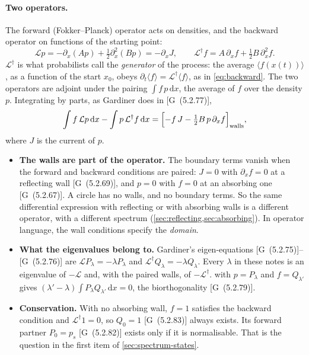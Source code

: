 \documentclass[11pt]{article}
\numberwithin{equation}{section}
\newcommand{\dd}{\mathrm{d}}
\newcommand{\avg}[1]{\langle #1\rangle}
\newcommand{\G}[1]{[G~(#1)]}
\begin{document}
\paragraph{Two operators.} The forward (Fokker--Planck) operator acts on densities, and the backward operator on
functions of the starting point:
\begin{equation}
  \mathcal Lp=-\partial_x(Ap)+\tfrac12\partial_x^2(Bp)=-\partial_xJ,\qquad
  \mathcal L^\dagger f=A\,\partial_xf+\tfrac12B\,\partial_x^2f .
  \label{eq:operators}
\end{equation}
$\mathcal L^\dagger$ is what probabilists call the \emph{generator} of the process: the average $\avg{f(x(t))}$,
as a function of the start $x_0$, obeys $\partial_t\avg f=\mathcal L^\dagger\avg f$, as in \cref{eq:backward}.
The two operators are adjoint under the pairing $\int f\,p\,\dd x$, the average of $f$ over the density $p$.
Integrating by parts, as Gardiner does in \G{5.2.77},
\begin{equation}
  \int f\,\mathcal Lp\,\dd x-\int p\,\mathcal L^\dagger f\,\dd x
  =\Bigl[-f\,J-\tfrac12B\,p\,\partial_xf\Bigr]_{\text{walls}} ,
  \label{eq:green}
\end{equation}
where $J$ is the current of $p$.
\begin{itemize}
  \item \textbf{The walls are part of the operator.} The boundary terms vanish when the forward and backward
        conditions are paired: $J=0$ with $\partial_xf=0$ at a reflecting wall \G{5.2.69}, and $p=0$ with $f=0$
        at an absorbing one \G{5.2.67}. A circle has no walls, and no boundary terms. So the same differential
        expression with reflecting or with absorbing walls is a different operator, with a different spectrum
        (\cref{sec:reflecting,sec:absorbing}). In operator language, the wall conditions specify the
        \emph{domain}.
  \item \textbf{What the eigenvalues belong to.} Gardiner's eigen-equations \G{5.2.75}--\G{5.2.76} are
        $\mathcal LP_\lambda=-\lambda P_\lambda$ and $\mathcal L^\dagger Q_\lambda=-\lambda Q_\lambda$. Every
        $\lambda$ in these notes is an eigenvalue of $-\mathcal L$ and, with the paired walls, of
        $-\mathcal L^\dagger$.  with $p=P_\lambda$ and $f=Q_{\lambda'}$ gives
        $(\lambda'-\lambda)\int P_\lambda Q_{\lambda'}\,\dd x=0$, the biorthogonality \G{5.2.79}.
  \item \textbf{Conservation.} With no absorbing wall, $f=1$ satisfies the backward condition and
        $\mathcal L^\dagger1=0$, so $Q_0=1$ \G{5.2.83} always exists. Its forward partner $P_0=p_s$ \G{5.2.82}
        exists only if it is normalisable. That is the question in the first item of
        \cref{sec:spectrum-states}.
\end{itemize}
\end{document}
